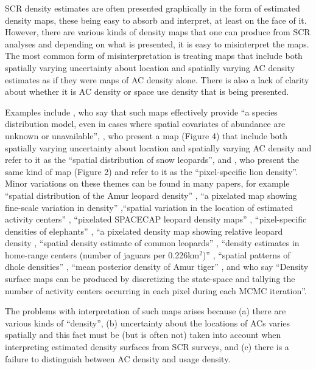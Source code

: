 \documentclass[useAMS,usenatbib,referee]{biom}
\begin{document}
SCR density estimates are often presented graphically in the form of estimated density maps, these being easy to absorb and interpret, at least on the face of it.  However, there are various kinds of density maps that one can produce from SCR analyses and depending on what is presented, it is easy to misinterpret the maps. The most common form of misinterpretation is treating maps that include both spatially varying uncertainty about location and spatially varying AC density estimates as if they were maps of AC density alone. There is also a lack of clarity about whether it is AC density or space use density that is being presented.

Examples include \cite{Dorazio+Karanth:17}, who say that such maps effectively provide  ``a species distribution model, even in cases where spatial covariates of abundance are unknown or unavailable'', \cite{Alexander+al:15}, who present a map (Figure 4) that include both spatially varying uncertainty about location and spatially varying AC density and refer to it as the ``spatial distribution of snow leopards'', and \cite{Elliot+Gopalaswamy:16}, who present the same kind of map (Figure 2) and refer to it as the ``pixel-specific lion density''. Minor variations on these themes can be found in many papers, for example ``spatial distribution of the Amur leopard density'' \citep{Qi2015}, ``a pixelated map showing fine-scale variation in density'' \citep{Fouche2020},``spatial variation in the location of estimated activity centers'' \citep{Blanc2013}, ``pixelated SPACECAP leopard density maps'' \citep{Devens2021}, ``pixel-specific densities of elephants'' \citep{Goswami2019}, ``a pixelated density map showing relative leopard density \citep{Kandel2020}, ``spatial density estimate of common leopards'' \citep{Goldberg2015}, ``density estimates in home-range centers (number of jaguars per 0.226km$^2$)'' \citep{Lavariega2020}, ``spatial patterns of dhole densities'' \citep{Srivathsa2021}, ``mean posterior density of Amur tiger'' \citep{Xiao2016}, and \cite{Chandler+Royle:13} who say ``Density surface maps can be produced by discretizing the state-space and tallying the number of activity centers occurring in each pixel during each MCMC iteration''.

The problems with interpretation of such maps arises because (a) there are various kinds of ``density'', (b) uncertainty about the locations of ACs varies spatially and this fact must be (but is often not) taken into account when interpreting estimated density surfaces from SCR surveys, and (c) there is a failure to distinguish between AC density and usage density. 
\end{document}
